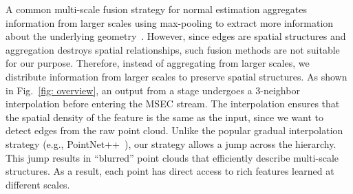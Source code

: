 \documentclass[sigconf]{acmart}
\begin{document}
A common multi-scale fusion strategy for normal estimation aggregates information from larger scales using max-pooling to extract more information about the underlying geometry~\cite{zhu2021adafit,li2022graphfit,li2022hsurf}. 
However, since edges are spatial structures and aggregation destroys spatial relationships, such fusion methods are not suitable for our purpose. 
Therefore, instead of aggregating from larger scales, we distribute information from larger scales to preserve spatial structures.  
As shown in Fig.~\ref{fig: overview}, an output from a stage undergoes a 3-neighbor interpolation before entering the MSEC stream. 
The interpolation ensures that the spatial density of the feature is the same as the input, since we want to detect edges from the raw point cloud. Unlike the popular gradual interpolation strategy (e.g., PointNet++~\cite{qi2017pointnet++}), our strategy allows a jump across the hierarchy. This jump results in ``blurred'' point clouds that efficiently describe multi-scale structures. As a result, each point has direct access to rich features learned at different scales.
  
\end{document}
